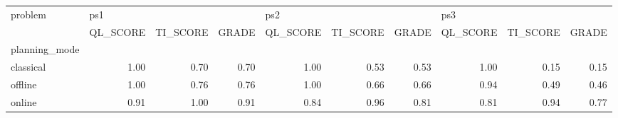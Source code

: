 \begin{tabular}{lrrrrrrrrr}
\toprule
problem & \multicolumn{3}{l}{ps1} & \multicolumn{3}{l}{ps2} & \multicolumn{3}{l}{ps3} \\
{} & QL\_SCORE & TI\_SCORE & GRADE & QL\_SCORE & TI\_SCORE & GRADE & QL\_SCORE & TI\_SCORE & GRADE \\
planning\_mode &          &          &       &          &          &       &          &          &       \\
\midrule
classical     &     1.00 &     0.70 &  0.70 &     1.00 &     0.53 &  0.53 &     1.00 &     0.15 &  0.15 \\
offline       &     1.00 &     0.76 &  0.76 &     1.00 &     0.66 &  0.66 &     0.94 &     0.49 &  0.46 \\
online        &     0.91 &     1.00 &  0.91 &     0.84 &     0.96 &  0.81 &     0.81 &     0.94 &  0.77 \\
\bottomrule
\end{tabular}
